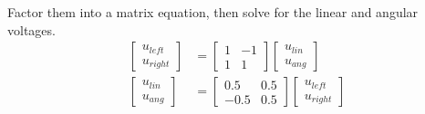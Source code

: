 Factor them into a matrix equation, then solve for the linear and angular
voltages.
\begin{align*}
  \begin{bmatrix}
    u_{left} \\
    u_{right}
  \end{bmatrix} &=
  \begin{bmatrix}
    1 & -1 \\
    1 & 1
  \end{bmatrix}
  \begin{bmatrix}
    u_{lin} \\
    u_{ang}
  \end{bmatrix} \\
  \begin{bmatrix}
    u_{lin} \\
    u_{ang}
  \end{bmatrix} &=
  \begin{bmatrix}
    0.5 & 0.5 \\
    -0.5 & 0.5
  \end{bmatrix}
  \begin{bmatrix}
    u_{left} \\
    u_{right}
  \end{bmatrix}
\end{align*}

